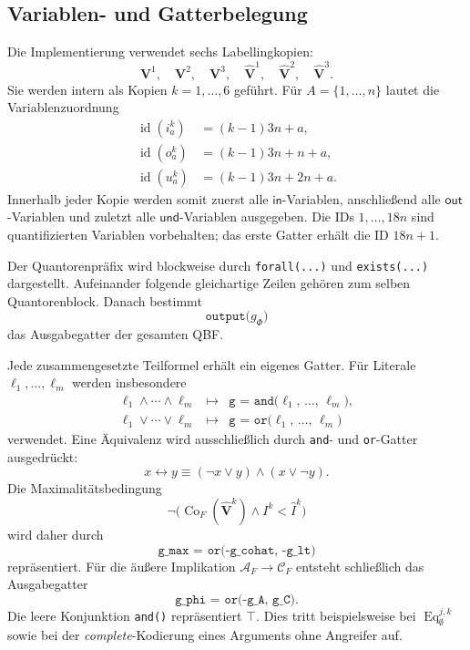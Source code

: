 \subsection{Variablen- und Gatterbelegung}

Die Implementierung verwendet sechs Labellingkopien:
\[
\mathbf V^1,\quad
\mathbf V^2,\quad
\mathbf V^3,\quad
\widehat{\mathbf V}^{1},\quad
\widehat{\mathbf V}^{2},\quad
\widehat{\mathbf V}^{3}.
\]
Sie werden intern als Kopien \(k=1,\ldots,6\) geführt. Für
\(A=\{1,\ldots,n\}\) lautet die Variablenzuordnung
\[
\begin{aligned}
\operatorname{id}(i_a^k)
    &=(k-1)3n+a,\\
\operatorname{id}(o_a^k)
    &=(k-1)3n+n+a,\\
\operatorname{id}(u_a^k)
    &=(k-1)3n+2n+a.
\end{aligned}
\]
Innerhalb jeder Kopie werden somit zuerst alle
\(\mathsf{in}\)-Variablen, anschließend alle
\(\mathsf{out}\)-Variablen und zuletzt alle
\(\mathsf{und}\)-Variablen ausgegeben. Die IDs \(1,\ldots,18n\) sind
quantifizierten Variablen vorbehalten; das erste Gatter erhält die ID
\(18n+1\).

Der Quantorenpräfix wird blockweise durch
\texttt{forall(...)} und \texttt{exists(...)} dargestellt. Aufeinander
folgende gleichartige Zeilen gehören zum selben Quantorenblock. Danach
bestimmt
\[
\texttt{output(}g_{\Phi}\texttt{)}
\]
das Ausgabegatter der gesamten QBF.

Jede zusammengesetzte Teilformel erhält ein eigenes Gatter. Für
Literale \(\ell_1,\ldots,\ell_m\) werden insbesondere
\[
\begin{array}{rcl}
\ell_1\land\cdots\land\ell_m
    &\longmapsto&
    \texttt{g = and(}\ell_1\texttt{, \ldots, }\ell_m\texttt{)},\\
\ell_1\lor\cdots\lor\ell_m
    &\longmapsto&
    \texttt{g = or(}\ell_1\texttt{, \ldots, }\ell_m\texttt{)}
\end{array}
\]
verwendet. Eine Äquivalenz wird ausschließlich durch
\texttt{and}- und \texttt{or}-Gatter ausgedrückt:
\[
x\leftrightarrow y
\equiv
(\neg x\lor y)\land(x\lor\neg y).
\]
Die Maximalitätsbedingung
\[
\neg\bigl(
    \operatorname{Co}_F(\widehat{\mathbf V}^{k})
    \land I^k<\widehat I^k
\bigr)
\]
wird daher durch
\[
\texttt{g\_max = or(-g\_cohat, -g\_lt)}
\]
repräsentiert. Für die äußere Implikation
\(\mathcal A_F\rightarrow\mathcal C_F\) entsteht schließlich das
Ausgabegatter
\[
\texttt{g\_phi = or(-g\_A, g\_C)}.
\]
Die leere Konjunktion \texttt{and()} repräsentiert \(\top\). Dies tritt
beispielsweise bei
\(\operatorname{Eq}^{j,k}_{\emptyset}\) sowie bei der
\emph{complete}-Kodierung eines Arguments ohne Angreifer auf.

